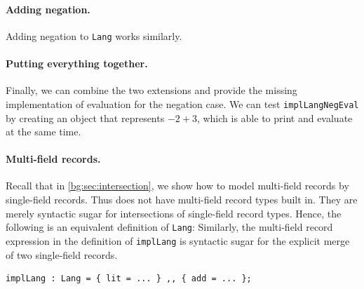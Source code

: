 \paragraph{Adding negation.}
Adding negation to \lstinline{Lang} works similarly.



\paragraph{Putting everything together.}
Finally, we can combine the two extensions and provide the missing
implementation of evaluation for the negation case.
We can test \lstinline{implLangNegEval} by creating an object that represents $-2 + 3$, which is able to print and evaluate at the same time.



\paragraph{Multi-field records.}
Recall that in \cref{bg:sec:intersection}, we show how to model multi-field records by
single-field records. Thus \namee does not have multi-field record types built in.
They are merely syntactic sugar for intersections of single-field record types.
Hence, the following is an equivalent definition of \lstinline{Lang}:
Similarly, the multi-field record expression in the definition of
\lstinline{implLang} is syntactic sugar for the explicit merge of two
single-field records.
\begin{lstlisting}
implLang : Lang = { lit = ... } ,, { add = ... };
\end{lstlisting}

